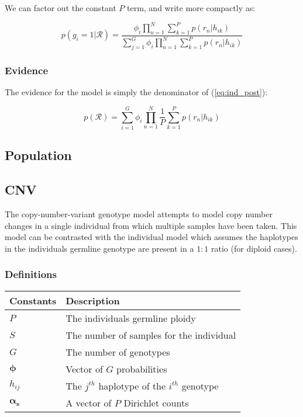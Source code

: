 \documentclass{article}
\begin{document}
We can factor out the constant $P$ term, and write more compactly as:

\begin{equation}
\label{eq:ind_post2}
 p(g_i = 1 | \mathcal{R}) = \frac{\phi_i \prod^N_{n = 1} \sum^P_{k = 1} p(r_n | h_{ik})}{\sum_{j = 1}^G \phi_i \prod^N_{n = 1} \sum^P_{k = 1} p(r_n | h_{ik})}
\end{equation}

\subsubsection{Evidence}

The evidence for the model is simply the denominator of (\ref{eq:ind_post}):

\begin{equation}
\label{eq:ind_ev}
 p(\mathcal{R}) = \sum_{i = 1}^G \phi_i \prod^N_{n = 1} \frac{1}{P} \sum^P_{k = 1} p(r_n | h_{ik})
\end{equation}

\subsection{Population}

\subsection{CNV}

The copy-number-variant genotype model attempts to model copy number changes in a single individual from which multiple samples have been taken. This model can be contrasted with the individual model which assumes the haplotypes in the individuals germline genotype are present in a $1:1$ ratio (for diploid cases).

\subsubsection{Definitions}

\begin{center}
\begin{tabular}{ll}
Constants & Description \\
\hline
$P$ & The individuals germline ploidy \\
$S$ & The number of samples for the individual \\
$G$ & The number of genotypes \\
$\boldsymbol{\phi}$ & Vector of $G$ probabilities \\
$h_{ij}$ & The $j^{th}$ haplotype of the $i^{th}$ genotype \\
$\boldsymbol{\alpha_s}$ & A vector of $P$ Dirichlet counts \\
\hline
\end{tabular}
\end{center}
\end{document}

